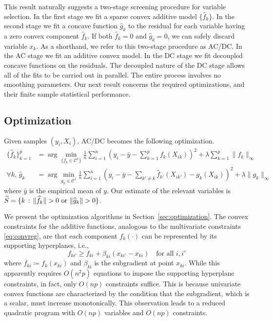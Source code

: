 This result naturally suggests a two-stage screening
procedure for variable selection. In the first stage we fit a sparse convex
additive model $\{\hat f_k\}$.  In the second stage we
fit a concave function $\hat g_k$ to the residual for each variable
having a zero convex component $\hat f_k$.  If both $\hat f_k = 0$ and
$\hat g_k = 0$, we can safely discard variable $x_k$.  
As a shorthand, we refer to this two-stage procedure as AC/DC.  In 
the AC stage we fit an additive convex model.  In the DC 
stage we fit decoupled concave functions on the residuals.  The
decoupled nature of the DC stage allows all of the fits to
be carried out in parallel. The entire process involves no smoothing parameters.
Our next result concerns the required optimizations, and their finite
sample statistical performance.


\subsection{Optimization}

Given samples $(y_i, X_i)$, AC/DC becomes the following optimization.
\begin{align*}
\{\hat{f}_k\}_{k=1}^p &= \arg\min_{\{f_k \in \mathcal{C}^1\}} \frac{1}{n}\sum_{i=1}^n \left(
        y_i - \bar{y} - \sum_{k=1}^p f_k(X_{ik}) \right)^2 + \lambda \sum_{k=1}^p \| f_k \|_\infty \\
\forall k, \, \hat{g}_k &= \arg\min_{g_k \in \mathcal{C}^1} \frac{1}{n} \sum_{i=1}^n \left(
    y_i - \bar{y} - \sum_{k' \neq k} \hat{f}_{k'}(X_{ik'}) - g_k(X_{ik}) \right)^2 + \lambda \| g_k \|_\infty
\end{align*}
where $\bar{y}$ is the empirical mean of $y$. Our estimate of the relevant variables is $\widehat{S} = \{ k \,:\, \| \widehat{f}_k \| > 0 \textrm{ or } \| \widehat{g}_k \| > 0\}$.

We present the optimization algorithms in Section~\ref{sec:optimization}.
The convex constraints for the additive functions, analogous to 
the multivariate constraints \eqref{eq:convreg},
are  that each component $f_{k}(\cdot)$ 
can be represented by its supporting hyperplanes, i.e.,
\begin{equation}
      f_{ki'} \geq f_{ki} + \beta_{ki}(x_{ki'}-x_{ki}) \quad \text{for
        all $i,i'$}
\end{equation}
where $f_{ki}\coloneqq f_{k}(x_{ki})$ and $\beta_{ki}$ is the
subgradient at point $x_{ki}$. While this apparently requires $O(n^2
p)$ equations to impose the supporting hyperplane constraints, 
in fact, only $O(np)$ constraints suffice.  This is because univariate convex functions are
characterized by the condition that the subgradient, which is a scalar, must
increase monotonically. This observation leads to a reduced quadratic
program with $O(np)$ variables and $O(np)$ constraints. 

